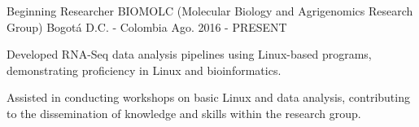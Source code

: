 


\begin{cventries}




\cventry
{Beginning Researcher} %
{BIOMOLC (Molecular Biology and Agrigenomics Research Group)} %
{Bogotá D.C. - Colombia} %
{Ago. 2016 - PRESENT} %
{ %
\begin{cvitems}
\item {Developed RNA-Seq data analysis pipelines using Linux-based programs, demonstrating proficiency in Linux and bioinformatics.}
\item {Assisted in conducting workshops on basic Linux and data analysis, contributing to the dissemination of knowledge and skills within the research group.}
\end{cvitems}
}


\end{cventries}